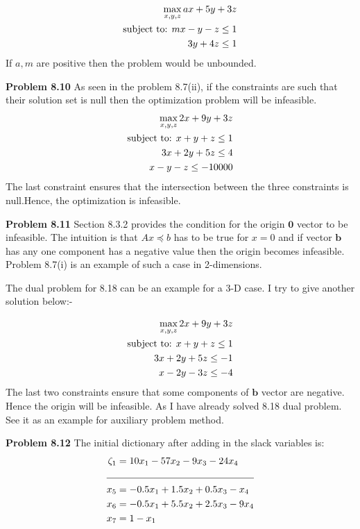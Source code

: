 \documentclass[letterpaper,12pt]{article}
\theoremstyle{definition}
\begin{document}
\begin{align*}
  \max_{{x,y,z}} ax+ 5y+ 3z\\
  \textnormal{subject to: } mx -y-z\leq 1\\
   3y+4z\leq 1\\
\end{align*}
If $a,m$ are positive then the problem would be unbounded.

\vspace{3mm}
\noindent\textbf{Problem 8.10}
As seen in the problem 8.7(ii), if the constraints are such that their solution set is null then the optimization problem will be infeasible.
\begin{align*}
  \max_{{x,y,z}} 2x+ 9y+ 3z\\
  \textnormal{subject to: } x + y + z\leq 1\\
   3x + 2y+ 5z\leq 4 \\
   x - y- z\leq -10000
\end{align*}
The last constraint ensures that the intersection between the three constraints is null.Hence, the optimization is infeasible.

\vspace{3mm}
\noindent\textbf{Problem 8.11}
Section 8.3.2 provides the condition for the origin $\textbf{0}$ vector to be infeasible. The intuition is that $Ax\preceq b$ has to be true for $x=0$ and if vector $\textbf{b}$ has any one component
has a negative value then the origin becomes infeasible. Problem 8.7(i) is an example of such a case in 2-dimensions.

The dual problem for 8.18 can be an example for a 3-D case. I try to give another solution below:-

\begin{align*}
  \max_{{x,y,z}} 2x+ 9y+ 3z\\
  \textnormal{subject to: } x + y + z\le 1\\
   3x + 2y+ 5z \le -1 \\
   x - 2y -3z\le -4
\end{align*}
The last two constraints ensure that some components of $\textbf{b}$  vector are negative. Hence the origin will be infeasible.
As I have already solved 8.18 dual problem. See it as an example for auxiliary problem method.

\vspace{3mm}
\noindent\textbf{Problem 8.12}
The initial dictionary after adding in the slack variables is:
\begin{align*}
  \zeta_1 &= 10x_1-57x_2-9x_3-24x_4\\
  \cline{1-2}
  x_5 &= -0.5x_1 + 1.5x_2+0.5x_3-x_4\\
  x_6 &= -0.5x_1+5.5x_2 + 2.5x_3 -9x_4\\
  x_7 &= 1-x_1\\
\end{align*}
\end{document}
